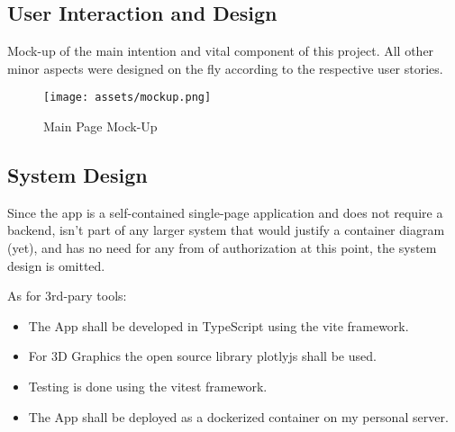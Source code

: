 \newpage
\subsection{ User Interaction and Design}

Mock-up of the main intention and vital component of this project. All other minor aspects were designed on the fly according to the respective user stories.
\begin{figure}[!h]
    \centering
    \caption{Main Page Mock-Up}
    \texttt{[image: assets/mockup.png]}
    \label{fig:mockup}
\end{figure}

\subsection{System Design}

Since the app is a self-contained single-page application and does not require a backend, isn’t part of any larger system that would justify a container diagram (yet), and has no need for any from of authorization at this point, the system design is omitted.

As for 3rd-pary tools:
\begin{itemize}
    \item The App shall be developed in TypeScript using the vite framework. %

    \item For 3D Graphics the open source library plotlyjs shall be used. %

    \item Testing is done using the vitest framework. %

    \item The App shall be deployed as a dockerized container on my personal server. %
\end{itemize}